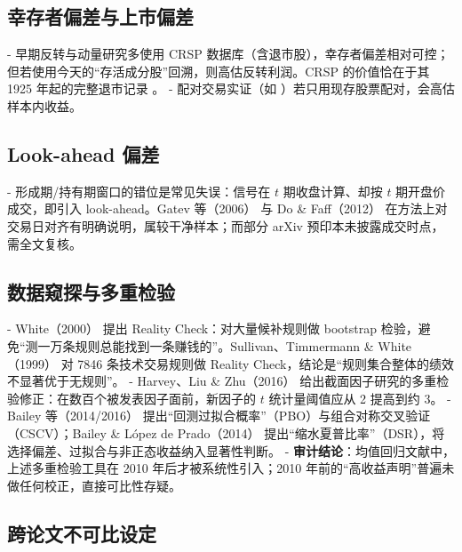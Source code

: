 \documentclass[11pt,a4paper]{ctexart}
\begin{document}
\subsection{幸存者偏差与上市偏差}

- 早期反转与动量研究多使用 CRSP 数据库（含退市股），幸存者偏差相对可控；但若使用今天的“存活成分股”回溯，则高估反转利润。CRSP 的价值恰在于其 1925 年起的完整退市记录 \cite{crsp_wrds}。
- 配对交易实证（如 \cite{gatev2006}）若只用现存股票配对，会高估样本内收益。

\subsection{Look-ahead 偏差}

- 形成期/持有期窗口的错位是常见失误：信号在 $t$ 期收盘计算、却按 $t$ 期开盘价成交，即引入 look-ahead。Gatev 等（2006）\cite{gatev2006} 与 Do \& Faff（2012）\cite{dofaff2012} 在方法上对交易日对齐有明确说明，属较干净样本；而部分 arXiv 预印本未披露成交时点，需全文复核。

\subsection{数据窥探与多重检验}

- White（2000）\cite{white2000} 提出 Reality Check：对大量候补规则做 bootstrap 检验，避免“测一万条规则总能找到一条赚钱的”。Sullivan、Timmermann \& White（1999）\cite{sullivan1999} 对 7846 条技术交易规则做 Reality Check，结论是“规则集合整体的绩效不显著优于无规则”。
- Harvey、Liu \& Zhu（2016）\cite{harveylz2016} 给出截面因子研究的多重检验修正：在数百个被发表因子面前，新因子的 $t$ 统计量阈值应从 2 提高到约 3。
- Bailey 等（2014/2016）\cite{bailey2014pbo} 提出“回测过拟合概率”（PBO）与组合对称交叉验证（CSCV）；Bailey \& L\'opez de Prado（2014）\cite{bailey2014dsr} 提出“缩水夏普比率”（DSR），将选择偏差、过拟合与非正态收益纳入显著性判断。
- \textbf{审计结论}：均值回归文献中，上述多重检验工具在 2010 年后才被系统性引入；2010 年前的“高收益声明”普遍未做任何校正，直接可比性存疑。

\subsection{跨论文不可比设定}
\end{document}
